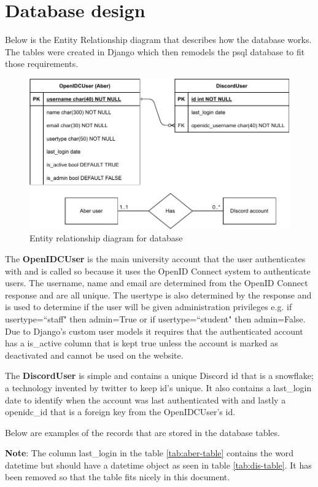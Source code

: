 \section{Database design}
Below is the Entity Relationship diagram that describes how the database works. The tables were created in Django which then remodels the psql \cite{psql} database to fit those requirements. 

\begin{figure}[H]
	\centering
	\includegraphics[width=0.8\linewidth]{Figures/database-er-0}
	\caption{Entity relationship diagram for database}
	\label{fig:database-er}
\end{figure}
The \textbf{OpenIDCUser} is the main university account that the user authenticates with and is called so because it uses the OpenID Connect \cite{OpenID} system to authenticate users. The username, name and email are determined from the OpenID Connect response and are all unique. The usertype is also determined by the response and is used to determine if the user will be given administration privileges e.g. if usertype=``staff" then admin=True or if usertype=``student" then admin=False. Due to Django's custom user models it requires that the authenticated account has a is\_active column that is kept true unless the account is marked as deactivated and cannot be used on the website.

The \textbf{DiscordUser} is simple and contains a unique Discord id that is a snowflake; a technology invented by twitter to keep id's unique. It also contains a last\_login date to identify when the account was last authenticated with and lastly a openidc\_id that is a foreign key from the OpenIDCUser's id.

Below are examples of the records that are stored in the database tables. 

\textbf{Note}: The column last\_login in the table \ref{tab:aber-table} contains the word datetime but should have a datetime object as seen in table \ref{tab:dis-table}. It has been removed so that the table fits nicely in this document.

